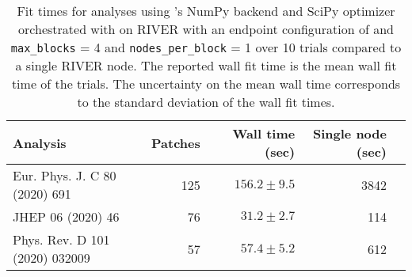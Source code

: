 \begin{table}[htpb]
\centering
\caption{Fit times for analyses using \pyhf{}'s NumPy backend and SciPy optimizer orchestrated with \funcX{} on RIVER with an endpoint configuration of and \texttt{max\_blocks} = 4 and \texttt{nodes\_per\_block} = 1 over 10 trials compared to a single RIVER node. The reported wall fit time is the mean wall fit time of the trials. The uncertainty on the mean wall time corresponds to the standard deviation of the wall fit times.}
\label{table:performance}
\begin{tabular}{@{}lrrrr@{}}
\toprule
                      Analysis & Patches & Wall time (sec) & Single node (sec) \\
\midrule
 Eur. Phys. J. C 80 (2020) 691 &     125 &   $156.2\pm9.5$ &              3842 \\
             JHEP 06 (2020) 46 &      76 &    $31.2\pm2.7$ &               114 \\
Phys. Rev. D 101 (2020) 032009 &      57 &    $57.4\pm5.2$ &               612 \\
\bottomrule
\end{tabular}
\end{table}
